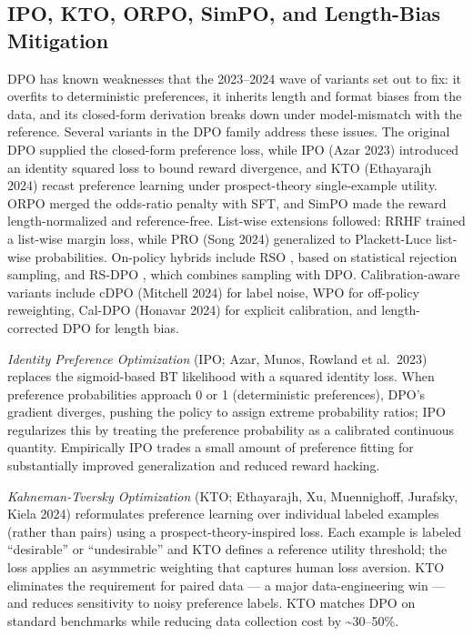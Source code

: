 \documentclass{article}
\begin{document}
\subsection{IPO, KTO, ORPO, SimPO, and Length-Bias Mitigation}\label{ipo-kto-orpo-simpo-and-length-bias-mitigation}

DPO has known weaknesses that the 2023--2024 wave of variants set out to fix: it overfits to deterministic preferences, it inherits length and format biases from the data, and its closed-form derivation breaks down under model-mismatch with the reference. Several variants in the DPO family address these issues. The original DPO \citep{rafailov2023directpreferenceop} supplied the closed-form preference loss, while IPO (Azar 2023) introduced an identity squared loss to bound reward divergence, and KTO (Ethayarajh 2024) recast preference learning under prospect-theory single-example utility. ORPO \citep{hong2024orpomonolithicpref} merged the odds-ratio penalty with SFT, and SimPO \citep{meng2024simposimpleprefere} made the reward length-normalized and reference-free. List-wise extensions followed: RRHF \citep{yuan2023rrhfrankresponsest} trained a list-wise margin loss, while PRO (Song 2024) generalized to Plackett-Luce list-wise probabilities. On-policy hybrids include RSO \citep{liu2023statisticalrejecti}, based on statistical rejection sampling, and RS-DPO \citep{khaki2024rsdpoahybridreject}, which combines sampling with DPO. Calibration-aware variants include cDPO (Mitchell 2024) for label noise, WPO \citep{zhou2024wpoenhancingrlhfwi} for off-policy reweighting, Cal-DPO (Honavar 2024) for explicit calibration, and length-corrected DPO \citep{park2024disentanglinglengt} for length bias.

\emph{Identity Preference Optimization} (IPO; Azar, Munos, Rowland et al.~2023) replaces the sigmoid-based BT likelihood with a squared identity loss. When preference probabilities approach 0 or 1 (deterministic preferences), DPO's gradient diverges, pushing the policy to assign extreme probability ratios; IPO regularizes this by treating the preference probability as a calibrated continuous quantity. Empirically IPO trades a small amount of preference fitting for substantially improved generalization and reduced reward hacking.

\emph{Kahneman-Tversky Optimization} (KTO; Ethayarajh, Xu, Muennighoff, Jurafsky, Kiela 2024) reformulates preference learning over individual labeled examples (rather than pairs) using a prospect-theory-inspired loss. Each example is labeled ``desirable'' or ``undesirable'' and KTO defines a reference utility threshold; the loss applies an asymmetric weighting that captures human loss aversion. KTO eliminates the requirement for paired data --- a major data-engineering win --- and reduces sensitivity to noisy preference labels. KTO matches DPO on standard benchmarks while reducing data collection cost by \textasciitilde30--50\%.
\end{document}
